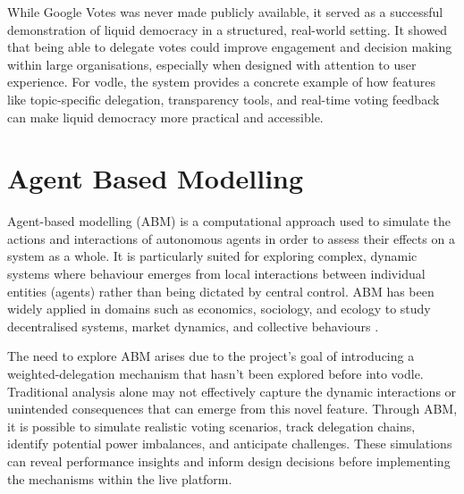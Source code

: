 While Google Votes was never made publicly available, it served as a successful demonstration of liquid democracy in a structured, real-world setting. It showed that being able to delegate votes could improve engagement and decision making within large organisations, especially when designed with attention to user experience. For vodle, the system provides a concrete example of how features like topic-specific delegation, transparency tools, and real-time voting feedback can make liquid democracy more practical and accessible.
\section{Agent Based Modelling}\label{sec:background_abm}
Agent-based modelling (ABM) is a computational approach used to simulate the actions and interactions of autonomous agents in order to assess their effects on a system as a whole. It is particularly suited for exploring complex, dynamic systems where behaviour emerges from local interactions between individual entities (agents) rather than being dictated by central control. ABM has been widely applied in domains such as economics, sociology, and ecology to study decentralised systems, market dynamics, and collective behaviours \citep{bonabeau2002agent}.

The need to explore ABM arises due to the project's goal of introducing a weighted-delegation mechanism that hasn't been explored before into vodle. Traditional analysis alone may not effectively capture the dynamic interactions or unintended consequences that can emerge from this novel feature. Through ABM, it is possible to simulate realistic voting scenarios, track delegation chains, identify potential power imbalances, and anticipate challenges. These simulations can reveal performance insights and inform design decisions before implementing the mechanisms within the live platform.

